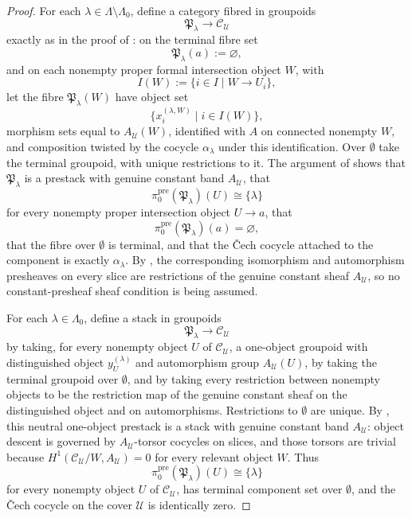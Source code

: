 \begin{proof}
For each $\lambda\in\Lambda\setminus\Lambda_0$, define a category fibred in groupoids
\[
\mathfrak P_\lambda\to \mathcal C_{\mathcal U}
\]
exactly as in the proof of : on the terminal fibre set
\[
\mathfrak P_\lambda(a):=\varnothing,
\]
and on each nonempty proper formal intersection object $W$, with
\[
I(W):=\{i\in I\mid W\to U_i\},
\]
let the fibre $\mathfrak P_\lambda(W)$ have object set
\[
\{x_i^{(\lambda,W)}\mid i\in I(W)\},
\]
morphism sets equal to \(A_{\mathcal U}(W)\), identified with \(A\) on
connected nonempty \(W\), and composition twisted by the cocycle
\(\alpha_\lambda\) under this identification. Over $\emptyset$ take the
terminal groupoid, with unique restrictions to it. The argument of
 shows that $\mathfrak P_\lambda$
is a prestack with genuine constant band $A_{\mathcal U}$, that
\[
\pi_0^{\mathrm{pre}}(\mathfrak P_\lambda)(U)\cong\{ \lambda\}
\]
for every nonempty proper intersection object $U\to a$, that
\[
\pi_0^{\mathrm{pre}}(\mathfrak P_\lambda)(a)=\varnothing,
\]
that the fibre over $\emptyset$ is terminal, and that the \v{C}ech cocycle
attached to the component is exactly $\alpha_\lambda$. By
, the corresponding
isomorphism and automorphism presheaves on every slice are restrictions of
the genuine constant sheaf $A_{\mathcal U}$, so no constant-presheaf
sheaf condition is being assumed.

For each $\lambda\in\Lambda_0$, define a stack in groupoids
\[
\mathfrak P_\lambda\to \mathcal C_{\mathcal U}
\]
by taking, for every nonempty object $U$ of $\mathcal C_{\mathcal U}$, a one-object groupoid with distinguished object $y_U^{(\lambda)}$ and automorphism group $A_{\mathcal U}(U)$, by taking the terminal groupoid over $\emptyset$, and by taking every restriction between nonempty objects to be the restriction map of the genuine constant sheaf on the distinguished object and on automorphisms. Restrictions to $\emptyset$ are unique. By , this neutral one-object prestack is a stack with genuine constant band $A_{\mathcal U}$: object descent is governed by \(A_{\mathcal U}\)-torsor cocycles on slices, and those torsors are trivial because \(H^1(\mathcal C_{\mathcal U}/W,A_{\mathcal U})=0\) for every relevant object \(W\). Thus
\[
\pi_0^{\mathrm{pre}}(\mathfrak P_\lambda)(U)\cong\{\lambda\}
\]
for every nonempty object $U$ of $\mathcal C_{\mathcal U}$, has terminal component set over $\emptyset$, and the \v{C}ech cocycle on the cover $\mathcal U$ is identically zero.


\end{proof}
